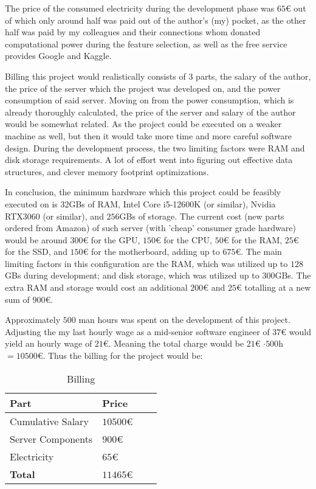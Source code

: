 The price of the consumed electricity during the development phase was $65$€ out of which only around half was paid out of the author's (my) pocket, as the other half was paid by my colleagues and their connections whom donated computational power during the feature selection, as well as the free service provides Google and Kaggle.\par
Billing this project would realistically consists of 3 parts, the salary of the author, the price of the server which the project was developed on, and the power consumption of said server. Moving on from the power consumption, which is already thoroughly calculated, the price of the server and salary of the author would be somewhat related. As the project could be executed on a weaker machine as well, but then it would take more time and more careful software design. During the development process, the two limiting factors were RAM and disk storage requirements. A lot of effort went into figuring out effective data structures, and clever memory footprint optimizations.\par
In conclusion, the minimum hardware which this project could be feasibly executed on is 32GBs of RAM, Intel Core i5-12600K (or similar), Nvidia RTX3060 (or similar), and $256$GBs of storage. The current cost (new parts ordered from Amazon) of such server (with 'cheap' consumer grade hardware) would be around $300$€ for the GPU, $150$€ for the CPU, $50$€ for the RAM, $25$€ for the SSD, and $150$€ for the motherboard, adding up to $675$€. The main limiting factors in this configuration are the RAM, which was utilized up to $128$GBs during development; and disk storage, which was utilized up to $300$GBs. The extra RAM and storage would cost an additional $200$€ and $25$€ totalling at a new sum of $900$€.\par
Approximately $500$ man hours was spent on the development of this project. Adjusting the my last hourly wage as a mid-senior software engineer of $37$€  would yield an hourly wage of $21$€. Meaning the total charge would be $21$€ $ \cdot 500$h $ = 10500$€. Thus the billing for the project would be:
\begin{table}[H]
\centering
\begin{tabular}{|l|l|l|l|}
\hline
\textbf{Part} & \textbf{Price} \\ \hline
Cumulative Salary & $10500$€ \\ \hline
Server Components & $900$€ \\ \hline
Electricity & $65$€ \\ \hline
\textbf{Total} & $11465$€ \\ \hline
\end{tabular}
\caption{Billing}
\label{tab:sus2}
\end{table}

